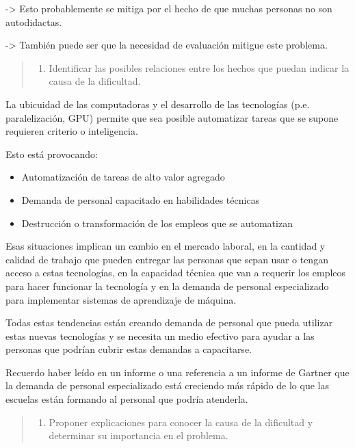 \documentclass[
  12,
]{scrartcl}
\providecommand{\tightlist}{%
  \setlength{\itemsep}{0pt}\setlength{\parskip}{0pt}}
\begin{document}
-\textgreater{} Esto probablemente se mitiga por el hecho de que muchas
personas no son autodidactas.

-\textgreater{} También puede ser que la necesidad de evaluación mitigue
este problema.

\begin{quote}
\begin{enumerate}
\def\labelenumi{\arabic{enumi}.}
\setcounter{enumi}{2}
\tightlist
\item
  Identificar las posibles relaciones entre los hechos que puedan
  indicar la causa de la dificultad.
\end{enumerate}
\end{quote}

La ubicuidad de las computadoras y el desarrollo de las tecnologías
(p.e. paralelización, GPU) permite que sea posible automatizar tareas
que se supone requieren criterio o inteligencia.

Esto está provocando:

\begin{itemize}
\tightlist
\item
  Automatización de tareas de alto valor agregado
\item
  Demanda de personal capacitado en habilidades técnicas
\item
  Destrucción o transformación de los empleos que se automatizan
\end{itemize}

Esas situaciones implican un cambio en el mercado laboral, en la
cantidad y calidad de trabajo que pueden entregar las personas que sepan
usar o tengan acceso a estas tecnologías, en la capacidad técnica que
van a requerir los empleos para hacer funcionar la tecnología y en la
demanda de personal especializado para implementar sistemas de
aprendizaje de máquina.

Todas estas tendencias están creando demanda de personal que pueda
utilizar estas nuevas tecnologías y se necesita un medio efectivo para
ayudar a las personas que podrían cubrir estas demandas a capacitarse.

Recuerdo haber leído en un informe o una referencia a un informe de
Gartner que la demanda de personal especializado está creciendo más
rápido de lo que las escuelas están formando al personal que podría
atenderla.

\begin{quote}
\begin{enumerate}
\def\labelenumi{\arabic{enumi}.}
\setcounter{enumi}{3}
\tightlist
\item
  Proponer explicaciones para conocer la causa de la dificultad y
  determinar su importancia en el problema.
\end{enumerate}
\end{quote}
\end{document}
